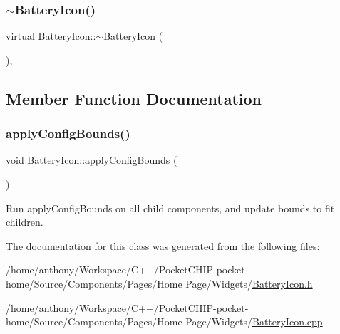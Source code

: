 \mbox{\label{classBatteryIcon_a2482be26740b3ca820657f2b720c7ff3}} 
\subsubsection{\texorpdfstring{$\sim$\+Battery\+Icon()}{~BatteryIcon()}}
{\footnotesize\ttfamily virtual Battery\+Icon\+::$\sim$\+Battery\+Icon (\begin{DoxyParamCaption}{ }\end{DoxyParamCaption})\hspace{0.3cm}{\ttfamily [inline]}, {\ttfamily [virtual]}}



\subsection{Member Function Documentation}
\mbox{\label{classBatteryIcon_afce051caf07675373237acf81f1fa1e6}} 
\subsubsection{\texorpdfstring{apply\+Config\+Bounds()}{applyConfigBounds()}}
{\footnotesize\ttfamily void Battery\+Icon\+::apply\+Config\+Bounds (\begin{DoxyParamCaption}{ }\end{DoxyParamCaption})}

Run apply\+Config\+Bounds on all child components, and update bounds to fit children. 

The documentation for this class was generated from the following files\+:\begin{DoxyCompactItemize}
\item 
/home/anthony/\+Workspace/\+C++/\+Pocket\+C\+H\+I\+P-\/pocket-\/home/\+Source/\+Components/\+Pages/\+Home Page/\+Widgets/\mbox{\hyperlink{BatteryIcon_8h}{Battery\+Icon.\+h}}\item 
/home/anthony/\+Workspace/\+C++/\+Pocket\+C\+H\+I\+P-\/pocket-\/home/\+Source/\+Components/\+Pages/\+Home Page/\+Widgets/\mbox{\hyperlink{BatteryIcon_8cpp}{Battery\+Icon.\+cpp}}\end{DoxyCompactItemize}
